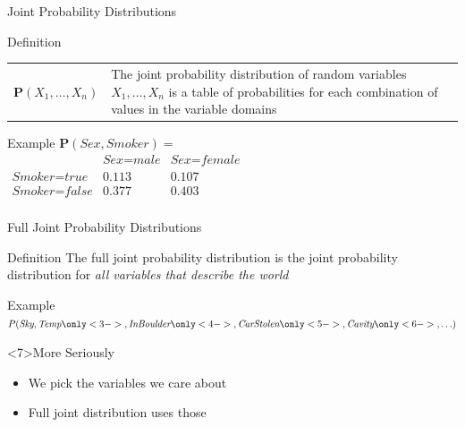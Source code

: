\documentclass[14pt]{beamer}
\begin{document}
\begin{frame}{Joint Probability Distributions}
	\begin{block}{Definition}
		\begin{tabular}{@{}lm{2.85in}@{}}
			\large $\mathbf{P}(X_1, \ldots, X_n)$
			&
			The \alert{joint probability distribution} of random variables $X_1, \ldots, X_n$ is a table of probabilities for each combination of values in the variable domains
		\end{tabular}
	\end{block}
	\pause
	\begin{block}{Example}
		$\mathbf{P}(\textit{Sex},\textit{Smoker}) = \mbox{}$ \\[.25em]
		\tab
		$
		\begin{array}{lcc}
			                           & \textit{Sex}=\textit{male} & \textit{Sex}=\textit{female} \\
			\textit{Smoker}=\textit{true}  & 0.113                  & 0.107 \\
			\textit{Smoker}=\textit{false} & 0.377                  & 0.403 \\
		\end{array}
		$
	\end{block}
\end{frame}
\begin{frame}{Full Joint Probability Distributions}
	\begin{block}{Definition}
		The \alert{full joint probability distribution} is the joint probability distribution for \emph{all variables that describe the world}
	\end{block}
	\pause
	\begin{block}{Example}
		$P(\textit{Sky},\textit{Temp}
		 \only<3->{,\textit{InBoulder}
		 \only<4->{,\textit{CarStolen}
		 \only<5->{,\textit{Cavity}
		 \only<6->{,\ldots}}}})$
	\end{block}
	\begin{block}{More Seriously}
		\begin{itemize}
			\item We pick the variables we care about
			\item Full joint distribution uses those
		\end{itemize}
	\end{block}
\end{frame}
\end{document}
